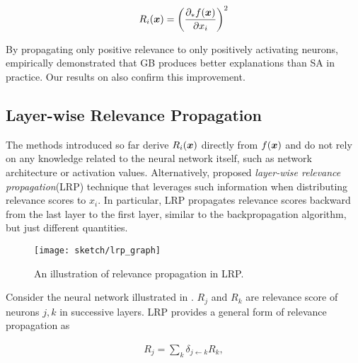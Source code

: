 \begin{align*}
	R_i(\x) = \bigg( \frac{ \partial_* f(\patvector{x}) }{ \partial x_i }  \bigg)^2
\end{align*}

By propagating only positive relevance to only positively activating neurons, \citet{SpringenbergStrivingSimplicityAll2015a} empirically demonstrated that GB produces better explanations than SA in practice. Our results on \addfigure{\ref{fig:lenet_heatmaps}} also confirm this improvement.
%

\subsection{Layer-wise Relevance Propagation}
The methods introduced so far derive $R_i(\boldsymbol{x})$ directly from $f(\patvector{x})$ and do not rely on any knowledge related to the neural network itself, such as network architecture or activation values. Alternatively, \citet{BachPixelWiseExplanationsNonLinear2015} proposed \textit{layer-wise relevance propagation}(LRP) technique that leverages such information when distributing relevance scores to $x_i$. In particular, LRP propagates relevance scores backward from the last layer to the first layer, similar to the backpropagation algorithm, but just different quantities.




 \begin{figure}
	\begin{center}
		\texttt{[image: sketch/lrp\_graph]}
		\caption{An illustration of relevance propagation in LRP.}
		\label{fig:lrp_graph}
	\end{center}
\end{figure}

Consider the neural network illustrated in \addfigure{\ref{fig:lrp_graph}}. $R_j$ and $R_k$ are relevance score of  neurons $j,k$ in successive layers.  LRP provides a general form of relevance propagation as 

\begin{align} \label{eq:general_lrp_rj}
	R_j = \sum_{k} 	\delta_{j\leftarrow k} R_{k} ,
\end{align}

